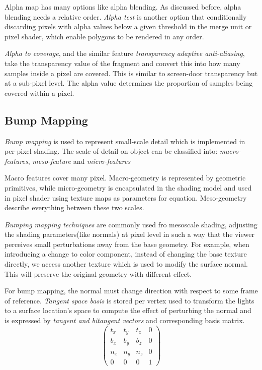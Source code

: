 \documentclass[10pt, a4paper]{article}
\begin{document}
Alpha map has many options like alpha blending. As discussed before, alpha blending needs a relative order. \emph{Alpha test} is another option that conditionally discarding pixels with alpha values below a given threshold in the merge unit or pixel shader, which enable polygons to be rendered in any order. 

\emph{Alpha to coverage}, and the similar feature \emph{transparency adaptive anti-aliasing}, take the transparency value of the fragment and convert this into how many samples inside a pixel are covered. This is similar to screen-door transparency but at a sub-pixel level. The alpha value determines the proportion of samples being covered within a pixel. 

\subsection{Bump Mapping}
\emph{Bump mapping} is used to represent small-scale detail which is implemented in per-pixel shading. The scale of detail on object can be classified into: \emph{macro-features}, \emph{meso-feature} and \emph{micro-features}

Macro features cover many pixel. Macro-geometry is represented by geometric primitives, while micro-geometry is encapsulated in the shading model and used in pixel shader using texture maps as parameters for equation. Meso-geometry describe everything between these two scales.

\emph{Bumping mapping techniques} are commonly used fro mesoscale shading, adjusting the shading parameters(like normals) at pixel level in such a way that the viewer perceives small perturbations away from the base geometry. For example, when introducing a change to color component, instead of changing the base texture directly, we access another texture which is used to modify the surface normal. This will preserve the original geometry with different effect. 

For bump mapping, the normal must change direction with respect to some frame of reference. \emph{Tangent space basis} is stored per vertex used to transform the lights to a surface location's space to compute the effect of perturbing the normal and is expressed by \emph{tangent and bitangent vectors} and corresponding basis matrix.
\begin{equation*}
    \begin{pmatrix}
    t_x & t_y & t_z & 0 \\
    b_x & b_y & b_z & 0 \\
    n_x & n_y & n_z & 0 \\
    0 & 0 & 0 & 1
    \end{pmatrix}
\end{equation*}  
\end{document}
